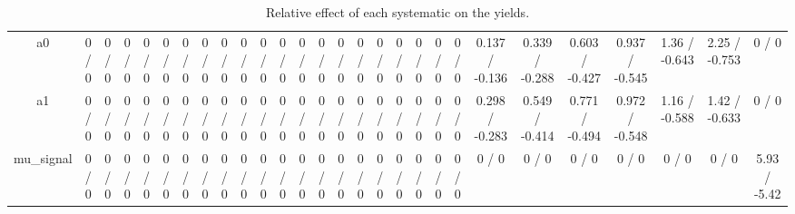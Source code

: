 \documentclass[10pt]{article}
\begin{document}
\begin{table}[htbp]
\begin{center}
\begin{tabular}{|c|c|c|c|c|c|c|c|c|c|c|c|c|c|c|c|c|c|c|c|c|c|c|c|c|c|c|c|}
  a0 & 0 / 0 & 0 / 0 & 0 / 0 & 0 / 0 & 0 / 0 & 0 / 0 & 0 / 0 & 0 / 0 & 0 / 0 & 0 / 0 & 0 / 0 & 0 / 0 & 0 / 0 & 0 / 0 & 0 / 0 & 0 / 0 & 0 / 0 & 0 / 0 & 0 / 0 & 0 / 0 & 0.137 / -0.136 & 0.339 / -0.288 & 0.603 / -0.427 & 0.937 / -0.545 & 1.36 / -0.643 & 2.25 / -0.753 & 0 / 0 \\ 
  a1 & 0 / 0 & 0 / 0 & 0 / 0 & 0 / 0 & 0 / 0 & 0 / 0 & 0 / 0 & 0 / 0 & 0 / 0 & 0 / 0 & 0 / 0 & 0 / 0 & 0 / 0 & 0 / 0 & 0 / 0 & 0 / 0 & 0 / 0 & 0 / 0 & 0 / 0 & 0 / 0 & 0.298 / -0.283 & 0.549 / -0.414 & 0.771 / -0.494 & 0.972 / -0.548 & 1.16 / -0.588 & 1.42 / -0.633 & 0 / 0 \\ 
  mu_signal & 0 / 0 & 0 / 0 & 0 / 0 & 0 / 0 & 0 / 0 & 0 / 0 & 0 / 0 & 0 / 0 & 0 / 0 & 0 / 0 & 0 / 0 & 0 / 0 & 0 / 0 & 0 / 0 & 0 / 0 & 0 / 0 & 0 / 0 & 0 / 0 & 0 / 0 & 0 / 0 & 0 / 0 & 0 / 0 & 0 / 0 & 0 / 0 & 0 / 0 & 0 / 0 & 5.93 / -5.42 \\ 
\hline 
\end{tabular} 
\caption{Relative effect of each systematic on the yields.} 
\end{center} 
\end{table} 
\end{document}
